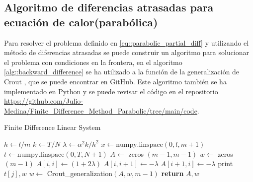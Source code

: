 \documentclass[a4paper]{article}
\begin{document}
\subsection{Algoritmo de diferencias atrasadas para ecuación de calor(parabólica)}
Para resolver el problema definido en \ref{eq::parabolic_partial_diff} y utilizando el método de diferencias atrasadas se puede construir un algoritmo para solucionar el problema con condiciones en la frontera, en el algoritmo \ref{alg::backward_difference} se ha utilizado a la función de la generalización de Crout \cite{Medina}, que se puede encontrar en GitHub. Este algoritmo también se ha implementado en Python y se puede revisar el código en el repositorio
\url{https://github.com/Julio-Medina/Finite_Difference_Method_Parabolic/tree/main/code}.
\begin{algorithm}[H]
\caption{Finite Difference Linear System}\label{alg::backward_difference}
\begin{algorithmic}[H]
\State $h \gets l/m$
\State $k \gets T/N$
\State $\lambda \gets \alpha^2 k /h^2$
\State $x\gets \text{numpy.linspace}(0, l, m+1)$
\State $t \gets \text{numpy.linspace}(0, T, N+1)$
\State $A \gets$ zeros $(m-1,m-1)$
\State $w \gets$ zeros $(m-1)$
\State $A[i,i]\gets (1+2\lambda)$
\State $A[i,i+1]\gets-\lambda$
\State $A[i+1,i]\gets-\lambda$
\EndIf
\EndFor
{}
\State print $t[j],w$
\State $w \gets$ Crout\_generalization$(A,w,m-1)$
\EndFor
\State \textbf{return} $A, w$
\EndFunction
\end{algorithmic}
\end{algorithm}
\end{document}
